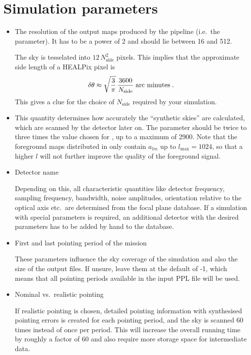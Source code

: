 \documentclass[pdf]{planckDoc}
\begin{document}
\clearpage
\section{Simulation parameters}
\label{simparam}

\begin{itemize}

\item {}

The resolution of the output maps produced by the pipeline
(i.e.~the  parameter).
It has to be a power of 2 and should lie between 16 and 512.

The sky is tesselated into $12\,N_\mathrm{side}^2$ pixels. This implies
that the approximate side length of a HEALPix pixel is
$$
  \delta\theta\approx\sqrt{\frac{3}{\pi}}\,
  \frac{3600}{N_\mathrm{side}}\;\hbox{arc minutes}\;.
$$
This gives a clue for the choice of $N_\mathrm{side}$ required by
your simulation.

\item {}

This quantity determines how accurately the ``synthetic skies'' are
calculated, which are scanned by the detector later on.
The  parameter should be twice to three times the value chosen
for , up to a maximum of 2900. Note that the foreground maps
distributed in  only contain $a_{lm}$ up to
$l_{\mathrm{max}}=1024$, so that a higher $l$ will not further improve the
quality of the foreground signal.

\item Detector name

Depending on this, all characteristic quantities like detector frequency,
sampling frequency, bandwidth, noise amplitudes, orientation relative to
the optical axis etc.\ are determined from the focal plane database.
If a simulation with special parameters is required, an additional detector
with the desired parameters has to be added by hand to the database.

\item First and last pointing period of the mission

These parameters influence the sky coverage of the simulation and also the
size of the output files. If unsure, leave them at the default of -1, which
means that all pointing periods available in the input PPL file will be used.

\item Nominal vs.\ realistic pointing

If realistic pointing is chosen, detailed pointing information with
synthesised pointing errors is created for each pointing period, and
the sky is scanned 60 times instead of once per period.
This will increase the overall running time by roughly a factor of 60
and also require more storage space for intermediate data.

\end{itemize}
\end{document}
